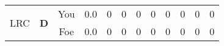 \documentclass[a4paper,12pt]{article}
\begin{document}
\begin{tabular}[t]{| c | c | c | c | c | c | c | c | c | c | c | c
      |}
        \hline
        \multirow{2}{*}{  LRC
             } &
              \multirow{2}{*}{  
                  \textbf{D}  } & 
                    \cellcolor{yellow!25} You & \cellcolor{yellow!25} 0.0 & \cellcolor{yellow!25} 0 &
                    \cellcolor{yellow!25} 0 & \cellcolor{yellow!25} 0 & \cellcolor{yellow!25} 0 &
                    \cellcolor{yellow!25} 0 & \cellcolor{yellow!25} 0 & \cellcolor{yellow!25} 0 &
                    \cellcolor{yellow!25} 0 \\
                    \cline{3-12}
                    & & \cellcolor{red!15} Foe & \cellcolor{red!15} 0.0 & \cellcolor{red!15} 0 & \cellcolor{red!15}
                    0 & \cellcolor{red!15} 0
                    & \cellcolor{red!15} 0 & \cellcolor{red!15}
                    0 & \cellcolor{red!15} 0 
                    & \cellcolor{red!15} 0 & \cellcolor{red!15}
                    0 \\
                    
                      
                        \hline
                      \end{tabular}
                      
\end{document}
